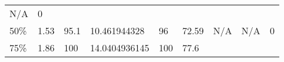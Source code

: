 \begin{longtable}[]{@{}lllllllll@{}}
\begin{minipage}[t]{0.08\columnwidth}
N/A\strut
\end{minipage} & \begin{minipage}[t]{0.11\columnwidth}\raggedright
0\strut
\end{minipage}\tabularnewline
\begin{minipage}[t]{0.05\columnwidth}\raggedright
50\%\strut
\end{minipage} & \begin{minipage}[t]{0.08\columnwidth}\raggedright
1.53\strut
\end{minipage} & \begin{minipage}[t]{0.09\columnwidth}\raggedright
95.1\strut
\end{minipage} & \begin{minipage}[t]{0.09\columnwidth}\raggedright
10.461944328\strut
\end{minipage} & \begin{minipage}[t]{0.08\columnwidth}\raggedright
96\strut
\end{minipage} & \begin{minipage}[t]{0.09\columnwidth}\raggedright
72.59\strut
\end{minipage} & \begin{minipage}[t]{0.09\columnwidth}\raggedright
N/A\strut
\end{minipage} & \begin{minipage}[t]{0.08\columnwidth}\raggedright
N/A\strut
\end{minipage} & \begin{minipage}[t]{0.11\columnwidth}\raggedright
0\strut
\end{minipage}\tabularnewline
\begin{minipage}[t]{0.05\columnwidth}\raggedright
75\%\strut
\end{minipage} & \begin{minipage}[t]{0.08\columnwidth}\raggedright
1.86\strut
\end{minipage} & \begin{minipage}[t]{0.09\columnwidth}\raggedright
100\strut
\end{minipage} & \begin{minipage}[t]{0.09\columnwidth}\raggedright
14.0404936145\strut
\end{minipage} & \begin{minipage}[t]{0.08\columnwidth}\raggedright
100\strut
\end{minipage} & \begin{minipage}[t]{0.09\columnwidth}\raggedright
77.6\strut
\end{minipage} & \begin{minipage}[t]{0.09\columnwidth}\raggedright

\end{minipage}
\end{longtable}

